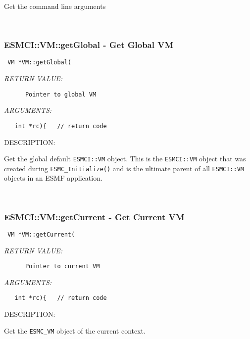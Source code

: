 {     Get the command line arguments
   
 
\mbox{}\hrulefill\
 
\subsubsection [ESMCI::VM::getGlobal] {ESMCI::VM::getGlobal - Get Global VM}


  
\begin{verbatim} VM *VM::getGlobal(\end{verbatim}{\em RETURN VALUE:}
\begin{verbatim}      Pointer to global VM\end{verbatim}{\em ARGUMENTS:}
\begin{verbatim}   int *rc){   // return code\end{verbatim}
{\sf DESCRIPTION:\\ }


     Get the global default {\tt ESMCI::VM} object. This is the {\tt ESMCI::VM}
     object that was created during {\tt ESMC\_Initialize()} and is the ultimate
     parent of all {\tt ESMCI::VM} objects in an ESMF application.
   
 
\mbox{}\hrulefill\
 
\subsubsection [ESMCI::VM::getCurrent] {ESMCI::VM::getCurrent - Get Current VM}


  
\begin{verbatim} VM *VM::getCurrent(\end{verbatim}{\em RETURN VALUE:}
\begin{verbatim}      Pointer to current VM\end{verbatim}{\em ARGUMENTS:}
\begin{verbatim}   int *rc){   // return code\end{verbatim}
{\sf DESCRIPTION:\\ }


     Get the {\tt ESMC\_VM} object of the current context.
   
 
}
